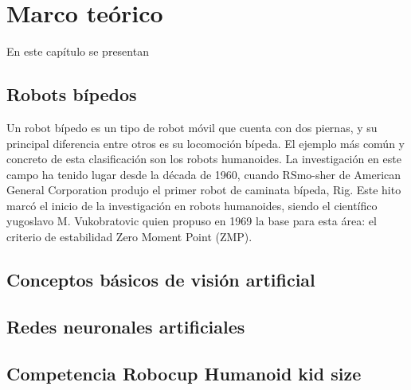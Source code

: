 \chapter{Marco teórico}
En este capítulo se presentan 
\section{Robots bípedos}
Un robot bípedo es un tipo de robot móvil que cuenta con dos piernas, y su principal diferencia entre otros es su locomoción bípeda. \cite{yang2017stateart} El ejemplo más común y concreto de esta clasificación son los robots humanoides. La investigación en este campo ha tenido lugar desde la década de 1960, cuando RSmo-sher de American General Corporation produjo el primer robot de caminata bípeda, Rig. Este hito marcó el inicio de la investigación en robots humanoides, siendo el científico yugoslavo M. Vukobratovic quien propuso en 1969 la base para esta área: el criterio de estabilidad Zero Moment Point (ZMP).\cite{chen2013walking}

\section{Conceptos básicos de visión artificial} 

\section{Redes neuronales artificiales}
    
\section{Competencia Robocup Humanoid kid size}
